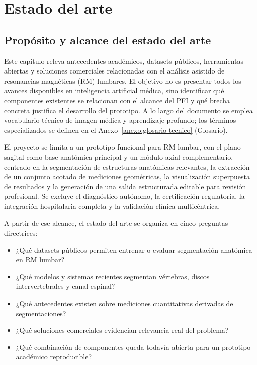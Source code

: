 \chapter{Estado del arte}

\section{Propósito y alcance del estado del arte}

Este capítulo releva antecedentes académicos, datasets públicos, herramientas abiertas y soluciones comerciales relacionadas con el análisis asistido de resonancias magnéticas (RM) lumbares. El objetivo no es presentar todos los avances disponibles en inteligencia artificial médica, sino identificar qué componentes existentes se relacionan con el alcance del PFI y qué brecha concreta justifica el desarrollo del prototipo. A lo largo del documento se emplea vocabulario técnico de imagen médica y aprendizaje profundo; los términos especializados se definen en el Anexo~\ref{anexo:glosario-tecnico} (Glosario).

El proyecto se limita a un prototipo funcional para RM lumbar, con el plano sagital como base anatómica principal y un módulo axial complementario, centrado en la segmentación de estructuras anatómicas relevantes, la extracción de un conjunto acotado de mediciones geométricas, la visualización superpuesta de resultados y la generación de una salida estructurada editable para revisión profesional. Se excluye el diagnóstico autónomo, la certificación regulatoria, la integración hospitalaria completa y la validación clínica multicéntrica.

A partir de ese alcance, el estado del arte se organiza en cinco preguntas directrices:

\begin{itemize}
  \item ¿Qué datasets públicos permiten entrenar o evaluar segmentación anatómica en RM lumbar?
  \item ¿Qué modelos y sistemas recientes segmentan vértebras, discos intervertebrales y canal espinal?
  \item ¿Qué antecedentes existen sobre mediciones cuantitativas derivadas de segmentaciones?
  \item ¿Qué soluciones comerciales evidencian relevancia real del problema?
  \item ¿Qué combinación de componentes queda todavía abierta para un prototipo académico reproducible?
\end{itemize}

